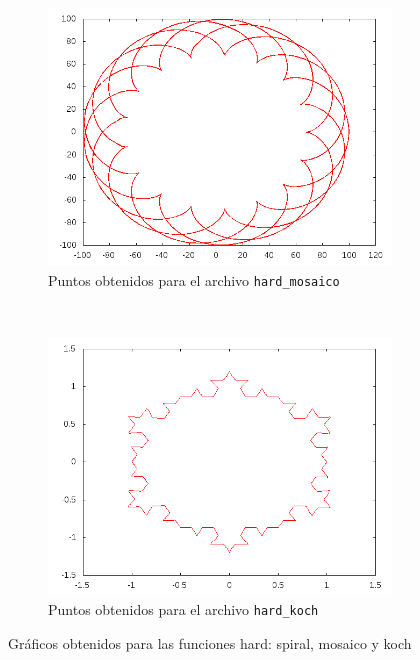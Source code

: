 \begin{figure}[!ht]
\begin{subfigure}[b]{0.32\textwidth}
                \includegraphics[width=\textwidth]{imgResu/mosaico.png}
                \caption{Puntos obtenidos para el archivo \texttt{hard\_mosaico}}
        \end{subfigure}
        ~ %
        \begin{subfigure}[b]{0.32\textwidth}
                \includegraphics[width=\textwidth]{imgResu/koch.png}
                \caption{Puntos obtenidos para el archivo \texttt{hard\_koch}}
        \end{subfigure}
        \caption{Gr\'aficos obtenidos para las funciones hard: spiral, mosaico y koch}
\end{figure}

